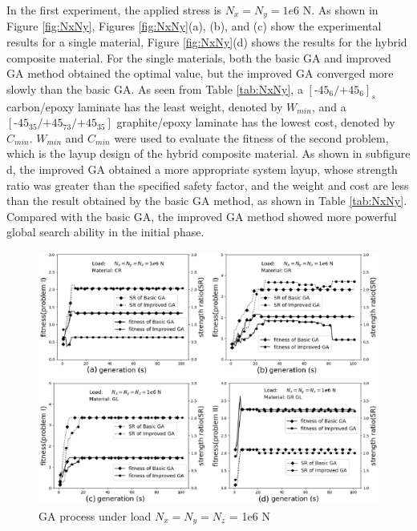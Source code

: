 \documentclass[USenglish,twocolumn]{article}
\begin{document}
In the first experiment, the applied stress is $N_x=N_y=1e6$ N. As shown in
Figure \ref{fig:NxNy}, Figures \ref{fig:NxNy}(a), (b), and (c) show the experimental results for a single material,
Figure \ref{fig:NxNy}(d) shows the results for the hybrid composite material.
 For the single materials, both the basic GA and improved
GA method obtained the optimal value, but the improved GA converged more slowly than the basic GA.
As seen from Table \ref{tab:NxNy}, a $[\text{-}45_{6}/\text{+}45_{6}]_s$ carbon/epoxy
laminate has the least weight, denoted by $W_{min}$, and a
$[\text{-}45_{35}/\text{+}45_{73}/\text{+}45_{35}]$ graphite/epoxy laminate has the lowest cost,
denoted by $C_{min}$. $W_{min}$ and $C_{min}$ were used to evaluate the fitness of the second
problem, which is the layup design of the hybrid composite material. As shown in subfigure d, the
improved GA obtained a more appropriate system layup, whose strength ratio was greater than the
specified safety factor, and the weight and cost are less than the result obtained by the basic GA method, as
shown in Table \ref{tab:NxNy}.
 Compared with the basic GA, the improved GA method showed more powerful
global search ability in the initial phase.

\begin{figure}
  \includegraphics[width=\linewidth]{NxNyNz}
  \caption{GA process under load  $N_x=N_y=N_z$ = 1e6 N}
  \label{fig:NxNyNz}
\end{figure}
\end{document}
